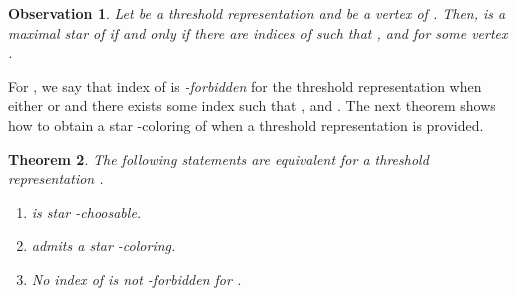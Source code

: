\documentclass[a4paper, 11pt, oneside]{article}
\newtheorem{theorem}{Theorem}
\newtheorem{observation}[theorem]{Observation}
\let\Definition=\emph
\begin{document}
\begin{observation}\label{obs:stars threshold}
  Let  be a threshold representation and  be a vertex of .  Then,  is a maximal star of  if and only if there are indices  of  such that , and  for some vertex .
\end{observation}

For , we say that index  of  is \Definition{-forbidden} for the threshold representation  when either  or  and there exists some index  such that ,  and .  The next theorem shows how to obtain a star -coloring of  when a threshold representation is provided.

\begin{theorem}\label{thm:threshold coloring}
  The following statements are equivalent for a threshold representation .
  \begin{enumerate}
    \item  is star -choosable.
    \item  admits a star -coloring.
    \item No index of  is not -forbidden for .
  \end{enumerate}
\end{theorem}
\end{document}
